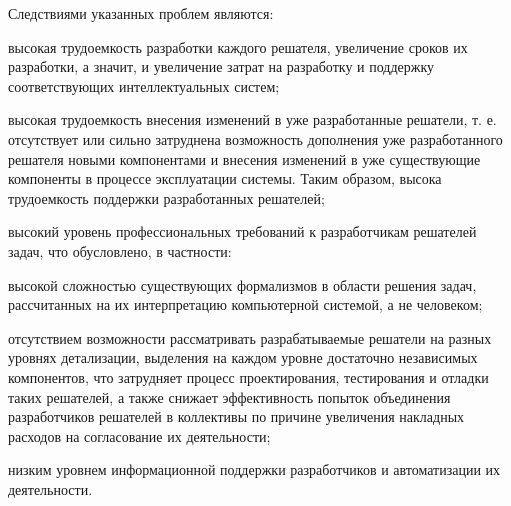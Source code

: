 \begin{SCn}
{Следствиями указанных проблем являются:
\begin{scnitemize}
\item высокая трудоемкость разработки каждого решателя, увеличение сроков их разработки, а значит, и увеличение затрат на разработку и поддержку соответствующих интеллектуальных систем;
\item высокая трудоемкость внесения изменений в уже разработанные решатели, т. е. отсутствует или сильно затруднена возможность дополнения уже разработанного решателя новыми компонентами и внесения изменений в уже существующие компоненты в процессе эксплуатации системы. Таким образом, высока трудоемкость поддержки разработанных решателей;
\item высокий уровень профессиональных требований к разработчикам решателей задач, что обусловлено, в частности:
\begin{scnitemizeii}
\item высокой сложностью существующих формализмов в области решения задач, рассчитанных на их интерпретацию компьютерной системой, а не человеком;
\item отсутствием возможности рассматривать разрабатываемые решатели на разных уровнях детализации, выделения на каждом уровне достаточно независимых компонентов, что затрудняет процесс проектирования, тестирования и отладки таких решателей, а также снижает эффективность попыток объединения разработчиков решателей в коллективы по причине увеличения накладных расходов на согласование их деятельности;
\item низким уровнем информационной поддержки разработчиков и автоматизации их деятельности.
\end{scnitemizeii}
\end{scnitemize}
}



\end{SCn}
